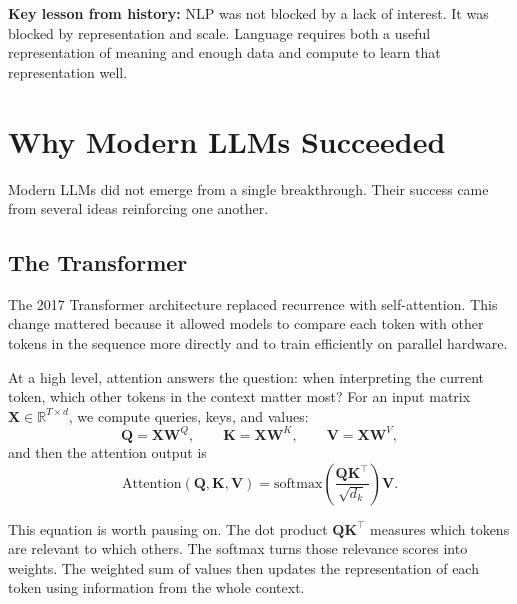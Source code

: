 \documentclass[12pt]{article}
\begin{document}
\begin{alert-box}
\textbf{Key lesson from history:} NLP was not blocked by a lack of interest. It was blocked by representation and scale. Language requires both a useful representation of meaning and enough data and compute to learn that representation well.
\end{alert-box}

\section{Why Modern LLMs Succeeded}

Modern LLMs did not emerge from a single breakthrough. Their success came from several ideas reinforcing one another.

\subsection{The Transformer}

The 2017 Transformer architecture replaced recurrence with self-attention. This change mattered because it allowed models to compare each token with other tokens in the sequence more directly and to train efficiently on parallel hardware.

At a high level, attention answers the question: when interpreting the current token, which other tokens in the context matter most? For an input matrix $\mathbf{X}\in\mathbb{R}^{T\times d}$, we compute queries, keys, and values:
\begin{equation}
    \mathbf{Q}=\mathbf{X}\mathbf{W}^Q,
    \qquad
    \mathbf{K}=\mathbf{X}\mathbf{W}^K,
    \qquad
    \mathbf{V}=\mathbf{X}\mathbf{W}^V,
    \label{t15eq:qkv}
\end{equation}
and then the attention output is
\begin{equation}
    \mathrm{Attention}(\mathbf{Q},\mathbf{K},\mathbf{V})
    = \mathrm{softmax}\!\left(\frac{\mathbf{Q}\mathbf{K}^\top}{\sqrt{d_k}}\right)\mathbf{V}.
    \label{t15eq:attention}
\end{equation}

This equation is worth pausing on. The dot product $\mathbf{Q}\mathbf{K}^\top$ measures which tokens are relevant to which others. The softmax turns those relevance scores into weights. The weighted sum of values then updates the representation of each token using information from the whole context.
\end{document}
